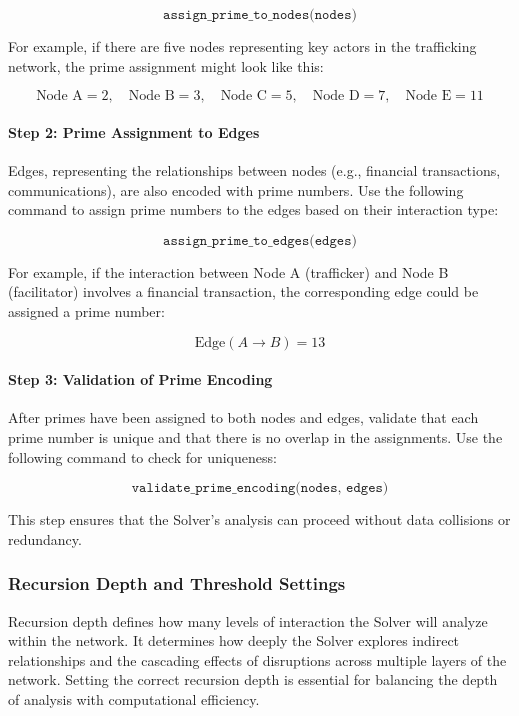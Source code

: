 \documentclass[%
 preprint, linenumbers,
 amsmath,amssymb,
 aps, physrev,
]{revtex4-2}
\begin{document}
\[
\texttt{assign\_prime\_to\_nodes(nodes)}
\]

For example, if there are five nodes representing key actors in the trafficking network, the prime assignment might look like this:

\[
\text{Node A} = 2, \quad \text{Node B} = 3, \quad \text{Node C} = 5, \quad \text{Node D} = 7, \quad \text{Node E} = 11
\]

\paragraph{Step 2: Prime Assignment to Edges}
Edges, representing the relationships between nodes (e.g., financial transactions, communications), are also encoded with prime numbers. Use the following command to assign prime numbers to the edges based on their interaction type:

\[
\texttt{assign\_prime\_to\_edges(edges)}
\]

For example, if the interaction between Node A (trafficker) and Node B (facilitator) involves a financial transaction, the corresponding edge could be assigned a prime number:

\[
\text{Edge}(A \rightarrow B) = 13
\]

\paragraph{Step 3: Validation of Prime Encoding}
After primes have been assigned to both nodes and edges, validate that each prime number is unique and that there is no overlap in the assignments. Use the following command to check for uniqueness:

\[
\texttt{validate\_prime\_encoding(nodes, edges)}
\]

This step ensures that the Solver’s analysis can proceed without data collisions or redundancy.

\subsubsection{Recursion Depth and Threshold Settings}

Recursion depth defines how many levels of interaction the Solver will analyze within the network. It determines how deeply the Solver explores indirect relationships and the cascading effects of disruptions across multiple layers of the network. Setting the correct recursion depth is essential for balancing the depth of analysis with computational efficiency.
\end{document}
